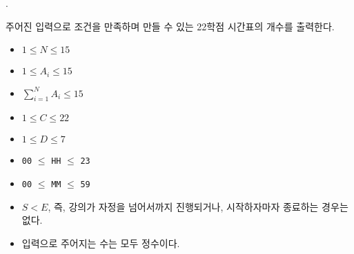 \begin{problem}{\probno{}. \probtitle{}}
\OutputFile

주어진 입력으로 조건을 만족하며 만들 수 있는 22학점 시간표의 개수를 출력한다.

\pagebreak

\Constraints

\begin{itemize}[topsep=0pt,noitemsep]
    \item $1 \le N \le 15$
    \item $1 \le A_i \le 15$
    \item $\sum_{i=1}^{N} A_i \le 15$
    \item $1 \le C \le 22$
    \item $1 \le D \le 7$
    \item \texttt{00} $\le$ \texttt{HH} $\le$ \texttt{23}
    \item \texttt{00} $\le$ \texttt{MM} $\le$ \texttt{59}
    \item $S < E$, 즉, 강의가 자정을 넘어서까지 진행되거나, 시작하자마자 종료하는 경우는 없다.
    \item 입력으로 주어지는 수는 모두 정수이다.
\end{itemize}

\Example

\begin{example}
\end{example}

\end{problem}